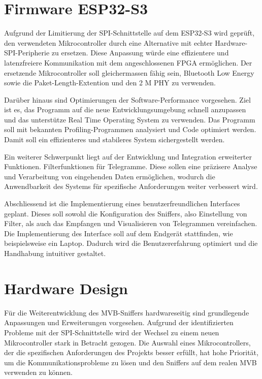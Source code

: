 \section{Firmware ESP32-S3}
\label{sec:AusblickFirmwareESP32}
Aufgrund der Limitierung der SPI-Schnittstelle auf dem ESP32-S3 wird geprüft, den verwendeten Mikrocontroller durch eine Alternative mit echter Hardware-SPI-Peripherie zu ersetzen. Diese Anpassung würde eine effizientere und latenzfreiere Kommunikation mit dem angeschlossenen FPGA ermöglichen. Der ersetzende Mikrocontroller soll gleichermassen fähig sein, Bluetooth Low Energy sowie die Paket-Length-Extention und den 2 M PHY zu verwenden.

Darüber hinaus sind Optimierungen der Software-Performance vorgesehen. Ziel ist es, das Programm auf die neue Entwicklungsumgebung schnell anzupassen und das unterstütze Real Time Operating System zu verwenden. Das Programm soll mit bekannten Profiling-Programmen analysiert und Code optimiert werden. Damit soll ein effizienteres und stabileres System sichergestellt werden.

Ein weiterer Schwerpunkt liegt auf der Entwicklung und Integration erweiterter Funktionen. Filterfunktionen für Telegramme. Diese sollen eine präzisere Analyse und Verarbeitung von eingehenden Daten ermöglichen, wodurch die Anwendbarkeit des Systems für spezifische Anforderungen weiter verbessert wird.

Abschliessend ist die Implementierung eines benutzerfreundlichen Interfaces geplant. Dieses soll sowohl die Konfiguration des Sniffers, also Einstellung von Filter, als auch das Empfangen und Visualisieren von Telegrammen vereinfachen. Die Implementierung des Interface soll auf dem Endgerät stattfinden, wie beispielsweise ein Laptop. Dadurch wird die Benutzererfahrung optimiert und die Handhabung intuitiver gestaltet.




\section{Hardware Design}
\label{sec:AusblickHardware}
Für die Weiterentwicklung des MVB-Sniffers hardwareseitig sind grundlegende Anpassungen und Erweiterungen vorgesehen. Aufgrund der identifizierten Probleme mit der SPI-Schnittstelle wird der Wechsel zu einem neuen Mikrocontroller stark in Betracht gezogen. Die Auswahl eines Mikrocontrollers, der die spezifischen Anforderungen des Projekts besser erfüllt, hat hohe Priorität, um die Kommunikationsprobleme zu lösen und den Sniffers auf dem realen MVB verwenden zu können.

